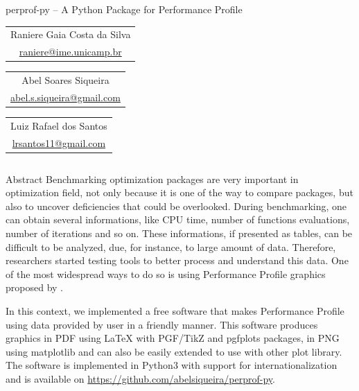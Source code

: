 \documentclass[]{beamer}
\begin{document}
\begin{frame}[t,fragile]
  \begin{center}
    \begin{huge}
      perprof-py -- A Python Package for Performance Profile
    \end{huge}

    \vspace{40pt}
    \begin{Large}
      \begin{tabular}[]{c}
        Raniere Gaia Costa da Silva \\
        \url{raniere@ime.unicamp.br}
      \end{tabular} \hspace{5cm}
      \begin{tabular}[]{c}
        Abel Soares Siqueira \\
        \url{abel.s.siqueira@gmail.com}
      \end{tabular} \hspace{5cm}
      \begin{tabular}[]{c}
        Luiz Rafael dos Santos \\
        \url{lrsantos11@gmail.com}
      \end{tabular}
    \end{Large}
  \end{center}
  \vspace{40pt}

  \begin{columns}[t]
    \begin{column}{0.4\textwidth}
      \begin{block}{Abstract}
        Benchmarking optimization packages are very important in optimization
        field, not only because it is one of the way to compare packages, but also
        to uncover deficiencies that could be overlooked. During benchmarking, one
        can obtain several informations, like CPU time, number of functions
        evaluations, number of iterations and so on. These informations, if
        presented as tables, can be difficult to be analyzed, due, for instance,
        to large amount of data. Therefore, researchers started testing tools to
        better process and understand this data.  One of the most widespread ways
        to do so is using Performance Profile graphics proposed by
        \citeauthor{Dolan2001}.

        In this context, we implemented a free software that makes Performance
        Profile using data provided by user in a friendly manner. This software
        produces graphics in PDF using LaTeX with PGF/TikZ\nocite{TikZ} and
        pgfplots\nocite{pgfplots} packages, in PNG using
        matplotlib\nocite{Hunter:2007} and can also be easily extended to use with
        other plot library. The software is implemented in Python3 with support
        for internationalization and is available on
        \url{https://github.com/abelsiqueira/perprof-py}.
      \end{block}


\end{column}
\end{columns}
\end{frame}
\end{document}
